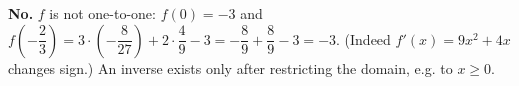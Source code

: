 \textbf{No.} $f$ is not one-to-one: $f(0)=-3$ and $f\!\left(-\dfrac23\right)=3\cdot\left(-\dfrac8{27}\right)+2\cdot\dfrac49-3=-\dfrac89+\dfrac89-3=-3$. (Indeed $f'(x)=9x^2+4x$ changes sign.) An inverse exists only after restricting the domain, e.g. to $x\ge0$.
